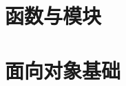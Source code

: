 \documentclass[13pt]{beamer}
\begin{document}
\section{函数与模块}

\section{面向对象基础}


% 
% 
% 
% 
\end{document}
